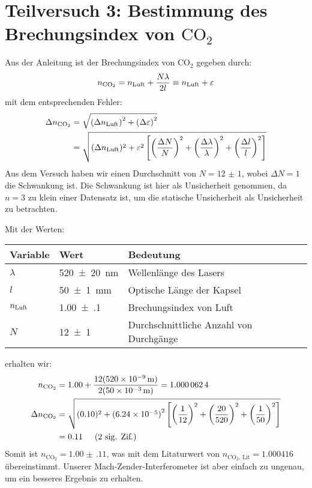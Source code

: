 \newcommand*{\ncot}[0]{n_{\text{CO}_2}}

\section{Teilversuch 3: Bestimmung des Brechungsindex von $\text{CO}_2$}
	Aus der Anleitung ist der Brechungsindex von $\text{CO}_2$ gegeben durch:
	\begin{equation}
		\ncot = \nluft + \frac{N\lambda}{2l} \equiv \nluft + \varepsilon
	\end{equation}
	mit dem entsprechenden Fehler:
	\begin{align}
		\Delta \ncot &= \addquad{\nluft, \varepsilon} \notag \\
		&=\sqrt{(\Delta\nluft)^2 + \varepsilon^2 \left[
			\left(\frac{\Delta N}{N}\right)^2 + 
			\left(\frac{\Delta \lambda}{\lambda}\right)^2 + 
			\left(\frac{\Delta l}{l}\right)^2
		\right]}
	\end{align}
	Aus dem Versuch haben wir einen Durchschnitt von $N = \num{12(1)}$, wobei $\Delta N = 1$ die Schwankung ist. Die Schwankung ist hier als Unsicherheit genommen, da $n=3$ zu klein einer Datensatz ist, um die statische Unsicherheit als Unsicherheit zu betrachten.

	Mit der Werten:
	\begin{center}
		\begin{tabular}{lll}
			\toprule
			Variable & Wert & Bedeutung \\
			\midrule
			$\lambda$ & \SI{520(20)}{\nano\meter} & Wellenlänge des Lasers \\
			$l$ & \SI{50(1)}{\milli\meter} & Optische Länge der Kapsel \\
			$n_{\text{Luft}}$ & \num{1.00(10)} & Brechungsindex von Luft \\
			$N$ & \num{12(1)} & Durchschnittliche Anzahl von Durchgänge \\
			\bottomrule
		\end{tabular}
	\end{center}
	erhalten wir:
	\begin{align}
		\ncot  &= \num{1.00} + \frac{12(\SI{520e-9}{\meter})}{2(\SI{50e-3}{\meter})} = \num{1.0000624} \\
		\Delta\ncot
			&= \sqrt{(\num{0.10})^2 + \left(\num{6.24e-5}\right)^2 \left[
				\left(\frac{1}{12}\right)^2 + 
				\left(\frac{20}{520}\right)^2 + 
				\left(\frac{1}{50}\right)^2
			\right]} \notag \\
			&= \num{0.11} \sigfig{2}
	\end{align}
	Somit ist $\ncot = \num{1.00(11)}$, was mit dem Litaturwert von $n_{\text{CO}_2\text{, Lit}} = \num{1.000416}$ übereinstimmt. Unserer Mach-Zender-Interferometer ist aber einfach zu ungenau, um ein besseres Ergebnis zu erhalten. 